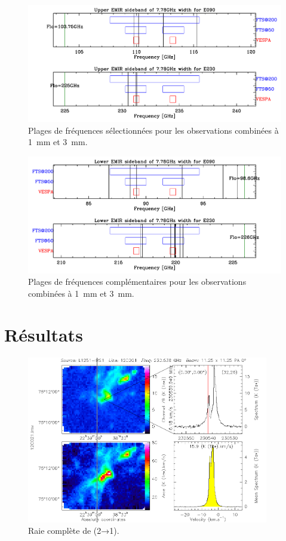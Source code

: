 \documentclass[a4paper,10pt,french]{article}
\newcommand{\troismm}{\SI{3}{\milli\meter}}
\newcommand{\unmm}{\SI{1}{\milli\meter}}
\begin{document}
\begin{figure}[!ht]
    \centering
    \includegraphics[width=\textwidth]{specsetup-3mm-1mm-u.pdf}
    \caption{Plages de fréquences sélectionnées pour les observations combinées à \unmm{} et \troismm.}
    \label{fig:specsetup_3mm_1mm_u}
\end{figure}

\begin{figure}[!ht]
    \centering
    \includegraphics[width=\textwidth]{specsetup-3mm-1mm-l.pdf}
    \caption{Plages de fréquences complémentaires pour les observations combinées à \unmm{} et \troismm.}
    \label{fig:specsetup_3mm_1mm_l}
\end{figure}

\clearpage
\section{Résultats}
\label{app:resultats}

\begin{figure}[!ht]
    \centering
    \includegraphics[width=0.94\textwidth]{12COfull.png}
    \caption{Raie complète de  (2→1).}
    \label{fig:12COfull}
\end{figure}
\end{document}
